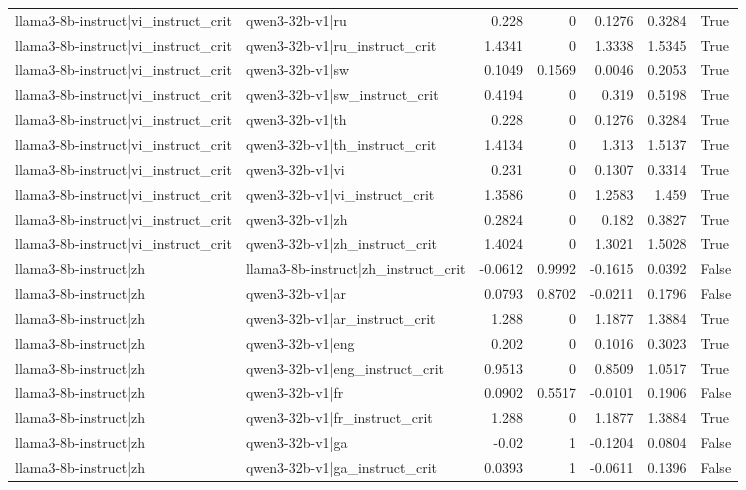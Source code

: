 \begin{table}
\begin{tabular}{l l r r r r l}
llama3-8b-instruct|vi_instruct_crit & qwen3-32b-v1|ru & 0.228 & 0 & 0.1276 & 0.3284 & True \\
llama3-8b-instruct|vi_instruct_crit & qwen3-32b-v1|ru_instruct_crit & 1.4341 & 0 & 1.3338 & 1.5345 & True \\
llama3-8b-instruct|vi_instruct_crit & qwen3-32b-v1|sw & 0.1049 & 0.1569 & 0.0046 & 0.2053 & True \\
llama3-8b-instruct|vi_instruct_crit & qwen3-32b-v1|sw_instruct_crit & 0.4194 & 0 & 0.319 & 0.5198 & True \\
llama3-8b-instruct|vi_instruct_crit & qwen3-32b-v1|th & 0.228 & 0 & 0.1276 & 0.3284 & True \\
llama3-8b-instruct|vi_instruct_crit & qwen3-32b-v1|th_instruct_crit & 1.4134 & 0 & 1.313 & 1.5137 & True \\
llama3-8b-instruct|vi_instruct_crit & qwen3-32b-v1|vi & 0.231 & 0 & 0.1307 & 0.3314 & True \\
llama3-8b-instruct|vi_instruct_crit & qwen3-32b-v1|vi_instruct_crit & 1.3586 & 0 & 1.2583 & 1.459 & True \\
llama3-8b-instruct|vi_instruct_crit & qwen3-32b-v1|zh & 0.2824 & 0 & 0.182 & 0.3827 & True \\
llama3-8b-instruct|vi_instruct_crit & qwen3-32b-v1|zh_instruct_crit & 1.4024 & 0 & 1.3021 & 1.5028 & True \\
llama3-8b-instruct|zh & llama3-8b-instruct|zh_instruct_crit & -0.0612 & 0.9992 & -0.1615 & 0.0392 & False \\
llama3-8b-instruct|zh & qwen3-32b-v1|ar & 0.0793 & 0.8702 & -0.0211 & 0.1796 & False \\
llama3-8b-instruct|zh & qwen3-32b-v1|ar_instruct_crit & 1.288 & 0 & 1.1877 & 1.3884 & True \\
llama3-8b-instruct|zh & qwen3-32b-v1|eng & 0.202 & 0 & 0.1016 & 0.3023 & True \\
llama3-8b-instruct|zh & qwen3-32b-v1|eng_instruct_crit & 0.9513 & 0 & 0.8509 & 1.0517 & True \\
llama3-8b-instruct|zh & qwen3-32b-v1|fr & 0.0902 & 0.5517 & -0.0101 & 0.1906 & False \\
llama3-8b-instruct|zh & qwen3-32b-v1|fr_instruct_crit & 1.288 & 0 & 1.1877 & 1.3884 & True \\
llama3-8b-instruct|zh & qwen3-32b-v1|ga & -0.02 & 1 & -0.1204 & 0.0804 & False \\
llama3-8b-instruct|zh & qwen3-32b-v1|ga_instruct_crit & 0.0393 & 1 & -0.0611 & 0.1396 & False \\

\end{tabular}
\end{table}
